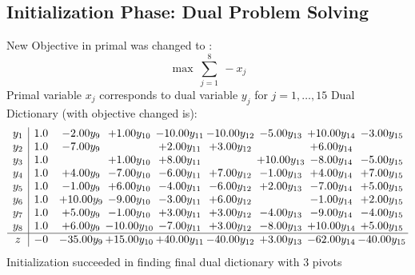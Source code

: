 \documentclass[9pt]{article}
\begin{document}
\subsection{Initialization Phase: Dual Problem Solving}
New Objective in primal was changed to : \[ \max\ \sum_{j=1}^{8}\ - x_j \] 
Primal variable $x_j$ corresponds to dual variable $y_j$ for $j = 1,\ldots,15$
Dual Dictionary (with objective changed is): 
\[\begin{array}{c| c c@{\hskip 2pt} c@{\hskip 2pt} c@{\hskip 2pt} c@{\hskip 2pt} c@{\hskip 2pt} c@{\hskip 2pt} c@{\hskip 2pt} }
 y_{1}   &  1.0 & -2.00 y_{9} & +  1.00 y_{10} & -10.00 y_{11} & -10.00 y_{12} & -5.00 y_{13} & + 10.00 y_{14} & -3.00 y_{15}\\
 y_{2}   &  1.0 & -7.00 y_{9} &   & +  2.00 y_{11} & +  3.00 y_{12} &   & +  6.00 y_{14} &   \\
 y_{3}   &  1.0  &   & +  1.00 y_{10} & +  8.00 y_{11} &   & + 10.00 y_{13} & -8.00 y_{14} & -5.00 y_{15}\\
 y_{4}   &  1.0 & +  4.00 y_{9} & -7.00 y_{10} & -6.00 y_{11} & +  7.00 y_{12} & -1.00 y_{13} & +  4.00 y_{14} & +  7.00 y_{15}\\
 y_{5}   &  1.0 & -1.00 y_{9} & +  6.00 y_{10} & -4.00 y_{11} & -6.00 y_{12} & +  2.00 y_{13} & -7.00 y_{14} & +  5.00 y_{15}\\
 y_{6}   &  1.0 & + 10.00 y_{9} & -9.00 y_{10} & -3.00 y_{11} & +  6.00 y_{12} &   & -1.00 y_{14} & +  2.00 y_{15}\\
 y_{7}   &  1.0 & +  5.00 y_{9} & -1.00 y_{10} & +  3.00 y_{11} & +  3.00 y_{12} & -4.00 y_{13} & -9.00 y_{14} & -4.00 y_{15}\\
 y_{8}   &  1.0 & +  6.00 y_{9} & -10.00 y_{10} & -7.00 y_{11} & +  3.00 y_{12} & -8.00 y_{13} & + 10.00 y_{14} & +  5.00 y_{15}\\
\hline
z    &  -0 & -35.00 y_{9} & + 15.00 y_{10} & + 40.00 y_{11} & -40.00 y_{12} & +  3.00 y_{13} & -62.00 y_{14} & -40.00 y_{15}\\
\end{array}\]
Initialization succeeded in finding final dual dictionary with 3 pivots
\end{document}
